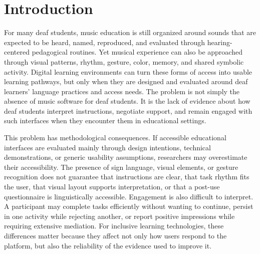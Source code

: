\documentclass{llncs}
\begin{document}
\section{Introduction}

For many deaf students, music education is still organized around sounds that are
expected to be heard, named, reproduced, and evaluated through hearing-centered
pedagogical routines. Yet musical experience can also be approached through visual patterns, rhythm, gesture, color, memory, and shared symbolic activity. Digital learning environments can turn these forms of access into usable
learning pathways, but only when they are designed and evaluated around deaf learners'
language practices and access needs. The problem is not simply the absence of music software
for deaf students. It is the lack of evidence about how deaf students interpret
instructions, negotiate support, and remain engaged with such interfaces when they
encounter them in educational settings.

This problem has methodological consequences. If accessible educational interfaces are
evaluated mainly through design intentions, technical demonstrations, or generic usability
assumptions, researchers may overestimate their accessibility. The presence of sign
language, visual elements, or gesture recognition does not guarantee that instructions
are clear, that task rhythm fits the user, that visual layout supports interpretation, or
that a post-use questionnaire is linguistically accessible. Engagement is also difficult to interpret. A participant may complete tasks efficiently without wanting
to continue, persist in one activity while rejecting another, or report positive
impressions while requiring extensive mediation. For inclusive learning technologies,
these differences matter because they affect not only how users respond to the platform,
but also the reliability of the evidence used to improve it.
\end{document}
